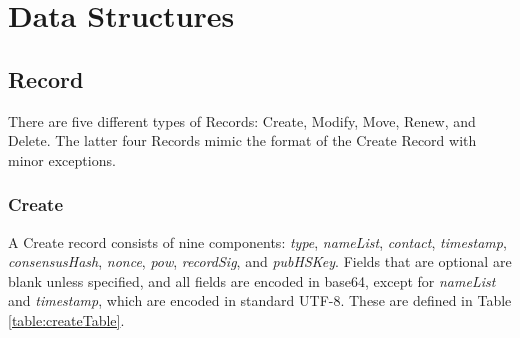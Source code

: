 \section{Data Structures}

\subsection{Record}
\label{sec:Record}


There are five different types of Records: Create, Modify, Move, Renew, and Delete. The latter four Records mimic the format of the Create Record with minor exceptions.

\subsubsection{Create}

A Create record consists of nine components: \emph{type}, \emph{nameList}, \emph{contact}, \emph{timestamp}, \emph{consensusHash}, \emph{nonce}, \emph{pow}, \emph{recordSig}, and \emph{pubHSKey}. Fields that are optional are blank unless specified, and all fields are encoded in base64, except for \emph{nameList} and \emph{timestamp}, which are encoded in standard UTF-8. These are defined in Table \ref{table:createTable}.

